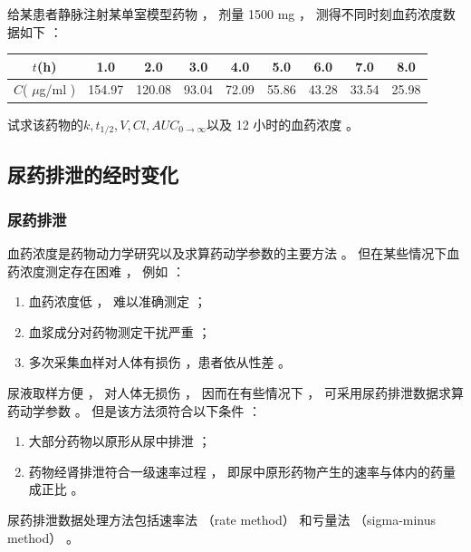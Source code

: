 \documentclass[dvipsnames, svgnames, x11names]{beamer}
\begin{document}
\begin{frame}[t]
    \frametitle{}
    \begin{question}
        给某患者静脉注射某单室模型药物 ， 剂量 1500 mg ， 测得不同时刻血药浓度数据如下 ：
        \begin{table}
            \centering
            \begin{tabular}{ccccccccc}
               \toprule
                $t$(h) & 1.0 & 2.0 & 3.0 & 4.0 & 5.0 & 6.0 & 7.0 & 8.0 \\ \hline
                $C$( $\mu$g/ml ) & 154.97 & 120.08 & 93.04 & 72.09 & 55.86 & 43.28 & 33.54 & 25.98 \\ \bottomrule
            \end{tabular}
        \end{table}
        试求该药物的$k,t_{1/2},V,Cl,{AUC}_{0\to\infty}$以及 12 小时的血药浓度 。
    \end{question}
\end{frame}


\subsection{尿药排泄的经时变化}

\begin{frame}
    \frametitle{尿药排泄}
    血药浓度是药物动力学研究以及求算药动学参数的主要方法 。 但在某些情况下血药浓度测定存在困难 ， 例如 ：
    \begin{enumerate}
      \item 血药浓度低 ， 难以准确测定 ；
      \item 血浆成分对药物测定干扰严重 ；
      \item 多次采集血样对人体有损伤 ，患者依从性差 。 
    \end{enumerate}
    尿液取样方便 ， 对人体无损伤 ， 因而在有些情况下 ， 可采用尿药排泄数据求算药动学参数 。 但是该方法须符合以下条件 ：
    \begin{enumerate}
    \item 大部分药物以原形从尿中排泄 ；
    \item 药物经肾排泄符合一级速率过程 ， 即尿中原形药物产生的速率与体内的药量成正比 。
    \end{enumerate}
    尿药排泄数据处理方法包括速率法 （rate method） 和亏量法 （sigma-minus method） 。
\end{frame}
\end{document}
